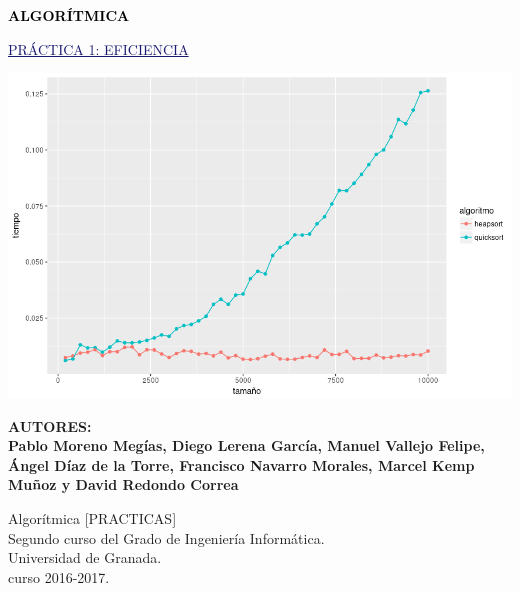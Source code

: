 \documentclass[a4paper, 11pt]{article}
\begin{document}
	
	
	\begin{titlepage}
		\begin{center}
			\vspace*{0.2cm}
			
			{\Huge \textbf{\textcolor{Black}{ALGORÍTMICA}}}
			
						{\textcolor{MidnightBlue}	{\Huge\underline{PRÁCTICA 1: EFICIENCIA}}}
			
				\vspace{0.2cm}
				
				\includegraphics[width=\textwidth]{cover.png}
				\vspace{0.2cm}
				

		
			\vspace{1cm}
			
			\textbf{AUTORES: \\
					Pablo Moreno Megías, Diego Lerena García, Manuel Vallejo Felipe, Ángel Díaz de la Torre, Francisco Navarro Morales, Marcel Kemp Muñoz y David Redondo Correa
		    		 }
	    		 \vspace{1cm}
	   
			
			\vfill
			Algorítmica [PRACTICAS]\\
			Segundo curso del Grado de Ingeniería Informática.\\
			Universidad de Granada.\\
			curso 2016-2017.
		\end{center}
	\end{titlepage}


\end{document}
